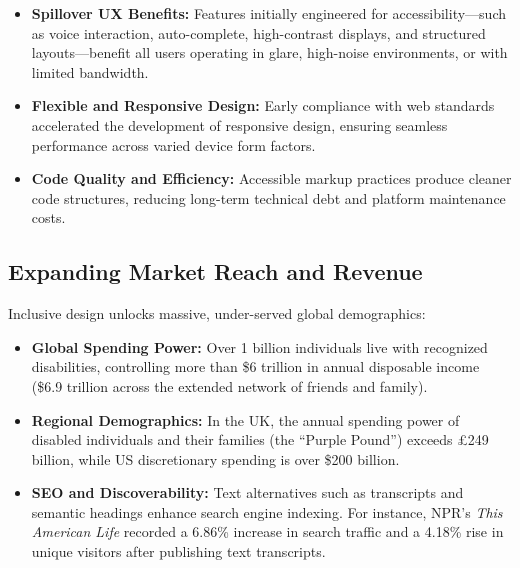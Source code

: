 \documentclass[11pt,a4paper]{article}
\begin{document}
	\begin{itemize}
  	\item \textbf{Spillover UX Benefits:} Features initially engineered for
        accessibility---such as voice interaction, auto-complete,
        high-contrast displays, and structured layouts---benefit all users
        operating in glare, high-noise environments, or with limited
        bandwidth.
 	 \item \textbf{Flexible and Responsive Design:} Early compliance with web
        standards accelerated the development of responsive design, ensuring
        seamless performance across varied device form factors.
 	 \item \textbf{Code Quality and Efficiency:} Accessible markup practices
        produce cleaner code structures, reducing long-term technical debt and
        platform maintenance costs.
	\end{itemize}

	\subsection{Expanding Market Reach and Revenue}
	Inclusive design unlocks massive, under-served global demographics:
	
	\begin{itemize}
 	 \item \textbf{Global Spending Power:} Over 1 billion individuals live with
        recognized disabilities, controlling more than \$6 trillion in annual
        disposable income (\$6.9 trillion across the extended network of
        friends and family).
 	 \item \textbf{Regional Demographics:} In the UK, the annual spending power
        of disabled individuals and their families (the ``Purple Pound'')
        exceeds \pounds 249 billion, while US discretionary spending is over
        \$200 billion.
  	\item \textbf{SEO and Discoverability:} Text alternatives such as
        transcripts and semantic headings enhance search engine indexing. For
        instance, NPR's \emph{This American Life} recorded a 6.86\% increase
        in search traffic and a 4.18\% rise in unique visitors after
        publishing text transcripts.
	\end{itemize}
\end{document}
